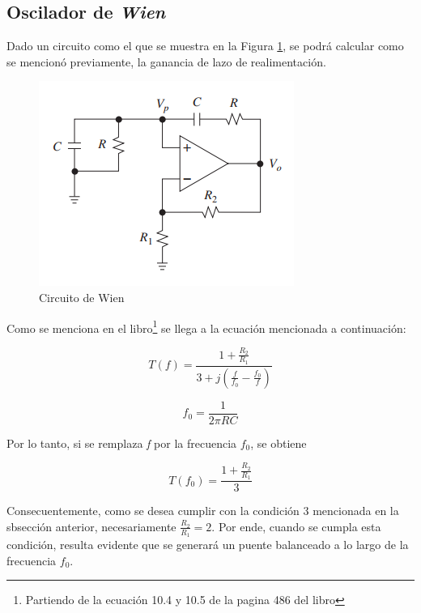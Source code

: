 \subsection{Oscilador de \emph{Wien}}

Dado un circuito como el que se muestra en la Figura \ref{1_1}, se
podrá calcular como se mencionó previamente, la ganancia de lazo de
realimentación. 

\begin{figure}[H]
\begin{centering}
\includegraphics{../Ex1/Resources/CircuitoWien.PNG}
\par\end{centering}
\caption{Circuito de Wien}
\label{1_1}

\end{figure}

Como se menciona en el libro\footnote{Partiendo de la ecuación 10.4 y 10.5 de la pagina 486 del libro}
se llega a la ecuación mencionada a continuación:

\begin{equation}
T(f)=\frac{1+\frac{R_{2}}{R_{1}}}{3+j\left(\frac{f}{f_{0}}-\frac{f_{0}}{f}\right)}\label{eq:1_1}
\end{equation}

\begin{equation}
f_{0}=\frac{1}{2\pi RC}\label{eq:1_1_1}
\end{equation}

Por lo tanto, si se remplaza \emph{f} por la frecuencia $f_{0}$,
se obtiene

\begin{equation}
T\left(f_{0}\right)=\frac{1+\frac{R_{2}}{R_{1}}}{3}\label{eq:1_2}
\end{equation}

Consecuentemente, como se desea cumplir con la condición 3 mencionada
en la sbsección anterior, necesariamente $\frac{R_{2}}{R_{1}}=2$.
Por ende, cuando se cumpla esta condición, resulta evidente que se
generará un puente balanceado a lo largo de la frecuencia $f_{0}$.

